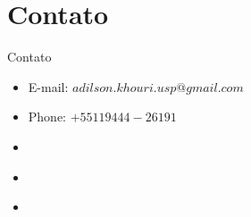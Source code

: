 \section{Contato}

\begin{frame}	
	\begin{block}{Contato}	
		\begin{itemize}
			\item E-mail:  $adilson.khouri.usp@gmail.com$
			\item Phone: $+55 11 9444-26191$
			\item \href{https://www.linkedin.com/in/adilson-khouri-51893918/}{\color{blue}{Linkedin}}
			\item \href{http://lattes.cnpq.br/2654721135214993}{\color{blue}{Curriculum Lattes}}
			\item \href{https://github.com/khouri/Apresentacao_Cusco}{\color{blue}{Código fonte GitHub}}
		\end{itemize}
	\end{block}
\end{frame}

